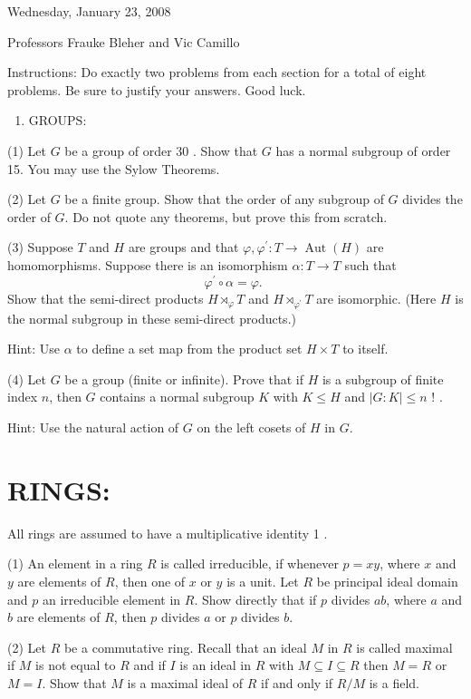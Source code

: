 \documentclass[10pt]{article}
\begin{document}
Wednesday, January 23, 2008

Professors Frauke Bleher and Vic Camillo

Instructions: Do exactly two problems from each section for a total of eight problems. Be sure to justify your answers. Good luck.

\begin{enumerate}
  \item GROUPS:
\end{enumerate}
(1) Let $G$ be a group of order 30 . Show that $G$ has a normal subgroup of order 15. You may use the Sylow Theorems.

(2) Let $G$ be a finite group. Show that the order of any subgroup of $G$ divides the order of $G$. Do not quote any theorems, but prove this from scratch.

(3) Suppose $T$ and $H$ are groups and that $\varphi, \varphi^{\prime}: T \rightarrow \operatorname{Aut}(H)$ are homomorphisms. Suppose there is an isomorphism $\alpha: T \rightarrow T$ such that
$$
\varphi^{\prime} \circ \alpha=\varphi \text {. }
$$
Show that the semi-direct products $H \rtimes_{\varphi} T$ and $H \rtimes_{\varphi^{\prime}} T$ are isomorphic. (Here $H$ is the normal subgroup in these semi-direct products.)

Hint: Use $\alpha$ to define a set map from the product set $H \times T$ to itself.

(4) Let $G$ be a group (finite or infinite). Prove that if $H$ is a subgroup of finite index $n$, then $G$ contains a normal subgroup $K$ with $K \leq H$ and $|G: K| \leq n$ ! .

Hint: Use the natural action of $G$ on the left cosets of $H$ in $G$.

\section{RINGS:}
All rings are assumed to have a multiplicative identity 1 .

(1) An element in a ring $R$ is called irreducible, if whenever $p=x y$, where $x$ and $y$ are elements of $R$, then one of $x$ or $y$ is a unit. Let $R$ be principal ideal domain and $p$ an irreducible element in $R$. Show directly that if $p$ divides $a b$, where $a$ and $b$ are elements of $R$, then $p$ divides $a$ or $p$ divides $b$.

(2) Let $R$ be a commutative ring. Recall that an ideal $M$ in $R$ is called maximal if $M$ is not equal to $R$ and if $I$ is an ideal in $R$ with $M \subseteq I \subseteq R$ then $M=R$ or $M=I$. Show that $M$ is a maximal ideal of $R$ if and only if $R / M$ is a field.
\end{document}
